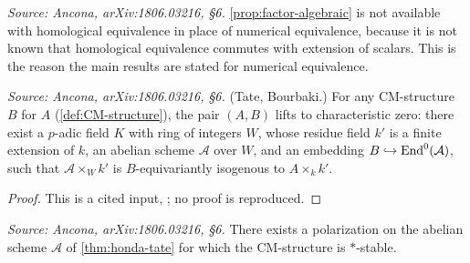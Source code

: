 \begin{remark}
  \label{rem:num-vs-hom}
  \textit{Source: Ancona, arXiv:1806.03216, §6.}
  \cref{prop:factor-algebraic} is not available with homological equivalence in
  place of numerical equivalence, because it is not known that homological
  equivalence commutes with extension of scalars. This is the reason the main
  results are stated for numerical equivalence.
\end{remark}

\begin{theorem}
  \label{thm:honda-tate}
  \textit{Source: Ancona, arXiv:1806.03216, §6.}
  (Tate, Bourbaki.) For any CM-structure \(B\) for \(A\)
  (\cref{def:CM-structure}), the pair \((A, B)\) lifts to characteristic zero:
  there exist a \(p\)-adic field \(K\) with ring of integers \(W\), whose residue
  field \(k'\) is a finite extension of \(k\), an abelian scheme \(\mathcal{A}\)
  over \(W\), and an embedding \(B \hookrightarrow \mathrm{End}^0(\mathcal{A})\), such
  that \(\mathcal{A} \times_W k'\) is \(B\)-equivariantly isogenous to
  \(A \times_k k'\).
\end{theorem}

\begin{proof}
  This is a cited input, \cite[Theorem 2]{TateBour}; no proof is reproduced.
\end{proof}

\begin{corollary}
  \label{cor:cm-stable}
  \textit{Source: Ancona, arXiv:1806.03216, §6.}
  There exists a polarization on the abelian scheme \(\mathcal{A}\) of
  \cref{thm:honda-tate} for which the CM-structure is \(*\)-stable.
\end{corollary}

